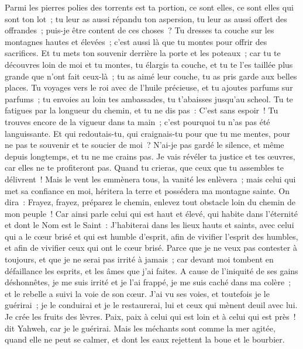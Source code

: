 \begin{multicols}{2}
Parmi les pierres polies des torrents est ta portion, ce sont elles, ce sont elles qui sont ton lot~; tu leur as aussi répandu ton aspersion, tu leur as aussi offert des offrandes~; puis-je être content de ces choses~?
Tu dresses ta couche sur les montagnes hautes et élevées~; c'est aussi là que tu montes pour offrir des sacrifices.
Et tu mets ton souvenir derrière la porte et les poteaux~; car tu te découvres loin de moi et tu montes, tu élargis ta couche, et tu te l'es taillée plus grande que n'ont fait ceux-là~; tu as aimé leur couche, tu as pris garde aux belles places.
Tu voyages vers le roi avec de l'huile précieuse, et tu ajoutes parfums sur parfums~; tu envoies au loin tes ambassades, tu t'abaisses jusqu'au scheol.
Tu te fatigues par la longueur du chemin, et tu ne dis pas~: C'est sans espoir~! Tu trouves encore de la vigueur dans ta main~; c'est pourquoi tu n'as pas été languissante.
Et qui redoutais-tu, qui craignais-tu pour que tu me mentes, pour ne pas te souvenir et te soucier de moi~? N'ai-je pas gardé le silence, et même depuis longtemps, et tu ne me crains pas.
Je vais révéler ta justice et tes œuvres, car elles ne te profiteront pas.
Quand tu crieras, que ceux que tu assembles te délivrent~! Mais le vent les emmènera tous, la vanité les enlèvera~; mais celui qui met sa confiance en moi, héritera la terre et possédera ma montagne sainte.
On dira~: Frayez, frayez, préparez le chemin, enlevez tout obstacle loin du chemin de mon peuple~!
Car ainsi parle celui qui est haut et élevé, qui habite dans l'éternité et dont le Nom est le Saint~: J'habiterai dans les lieux hauts et saints, avec celui qui a le cœur brisé et qui est humble d'esprit, afin de vivifier l'esprit des humbles, et afin de vivifier ceux qui ont le cœur brisé.
Parce que je ne veux pas contester à toujours, et que je ne serai pas irrité à jamais~; car devant moi tombent en défaillance les esprits, et les âmes que j'ai faites.
A cause de l'iniquité de ses gains déshonnêtes, je me suis irrité et je l'ai frappé, je me suis caché dans ma colère~; et le rebelle a suivi la voie de son cœur.
J'ai vu ses voies, et toutefois je le guérirai~; je le conduirai et je le restaurerai, lui et ceux qui mènent deuil avec lui.
Je crée les fruits des lèvres. Paix, paix à celui qui est loin et à celui qui est près~! dit Yahweh, car je le guérirai.
Mais les méchants sont comme la mer agitée, quand elle ne peut se calmer, et dont les eaux rejettent la boue et le bourbier.

\end{multicols}
